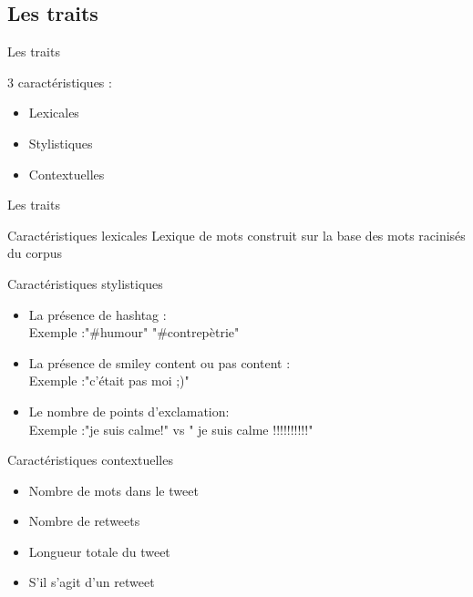 \documentclass{beamer}
\begin{document}
\subsection{Les traits}
\begin{frame}{Les traits}

3 caractéristiques : 
\begin{itemize}
  \item Lexicales
  \item Stylistiques
  \item Contextuelles
\end{itemize}


\end{frame}






\begin{frame}[allowframebreaks]{Les traits}

\begin{block}{Caractéristiques lexicales}
Lexique de mots construit sur la base des mots racinisés du corpus

\end{block}


\begin{block}{Caractéristiques stylistiques} 
\begin{itemize}
\item La présence de hashtag :\\
Exemple :"\#humour" "\#contrepètrie"
\item La présence de smiley content ou pas content :\\
Exemple :"c'était pas moi ;)"
\item Le nombre de points d'exclamation: \\
Exemple :"je suis calme!" vs " je suis calme !!!!!!!!!!" 
\end{itemize}
\end{block}


\begin{block}{Caractéristiques contextuelles}
\begin{itemize}
  \item Nombre de mots dans le tweet
  \item Nombre de retweets
  \item Longueur totale du tweet
  \item S'il s'agit d'un retweet
\end{itemize}
\end{block}


\end{frame}
\end{document}
